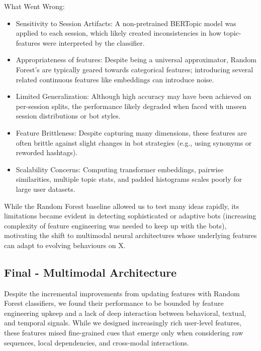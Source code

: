 \documentclass[conference]{IEEEtran}
\begin{document}
What Went Wrong:
\begin{itemize}
    \item Sensitivity to Session Artifacts: A non-pretrained BERTopic model was applied to each session, 
    which likely created inconsistencies in how topic-features were interpreted by the classifier.
    
    \item Appropriateness of features: Despite being a universal approximator, Random Forest's are typically geared towards categorical features; introducing several related continuous features like embeddings can introduce noise.
    
    \item Limited Generalization: Although high accuracy may have been achieved on per-session splits, the performance likely degraded when faced with unseen session distributions or bot styles.
    
    \item Feature Brittleness: Despite capturing many dimensions, these features are often brittle against slight changes in bot strategies (e.g., using synonyms or reworded hashtags).
    
    \item Scalability Concerns: Computing transformer embeddings, pairwise similarities, multiple topic stats, and padded histograms scales poorly for large user datasets.
\end{itemize}
While the Random Forest baseline allowed us to test many ideas rapidly, 
its limitations became evident in detecting sophisticated or adaptive bots (increasing complexity of feature engineering was needed to keep up with the bots), 
motivating the shift to multimodal neural architectures whose underlying features can adapt to evolving behaviours on X.



\subsection{Final - Multimodal Architecture}

Despite the incremental improvements from updating features with Random Forest classifiers, 
we found their performance to be bounded by feature engineering upkeep and a lack of deep interaction between behavioral, 
textual, and temporal signals. While we designed increasingly rich user-level features, these features
mised fine-grained cues that emerge only when considering raw sequences, local dependencies, 
and cross-modal interactions. 
\end{document}
